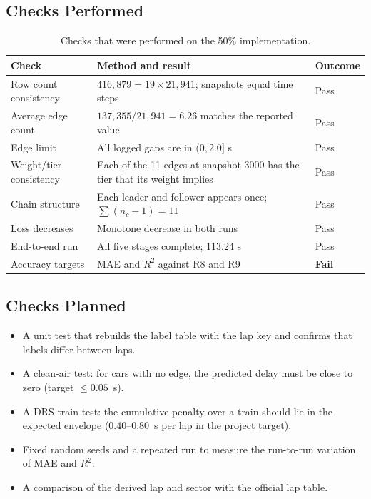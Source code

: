 \documentclass[11pt,a4paper]{article}
\begin{document}
\subsection{Checks Performed}
\begin{table}[H]
\centering
\caption{Checks that were performed on the 50\% implementation.}
\label{tab:checks}
\small
\begin{tabularx}{\linewidth}{@{}p{4.1cm}Xl@{}}
\toprule
\textbf{Check} & \textbf{Method and result} & \textbf{Outcome} \\
\midrule
Row count consistency & $416{,}879 = 19 \times 21{,}941$; snapshots equal time steps & Pass \\
Average edge count & $137{,}355 / 21{,}941 = 6.26$ matches the reported value & Pass \\
Edge limit & All logged gaps are in $(0, 2.0]$ s & Pass \\
Weight/tier consistency & Each of the 11 edges at snapshot 3000 has the tier that its weight implies & Pass \\
Chain structure & Each leader and follower appears once; $\sum(n_c-1)=11$ & Pass \\
Loss decreases & Monotone decrease in both runs & Pass \\
End-to-end run & All five stages complete; 113.24 s & Pass \\
Accuracy targets & MAE and $R^2$ against R8 and R9 & \textbf{Fail} \\
\bottomrule
\end{tabularx}
\end{table}

\subsection{Checks Planned}
\begin{itemize}[leftmargin=*]
  \item A unit test that rebuilds the label table with the lap key and
        confirms that labels differ between laps.
  \item A clean-air test: for cars with no edge, the predicted delay must be
        close to zero (target $\le 0.05$~s).
  \item A DRS-train test: the cumulative penalty over a train should lie in
        the expected envelope (0.40--0.80~s per lap in the project target).
  \item Fixed random seeds and a repeated run to measure the run-to-run
        variation of MAE and $R^2$.
  \item A comparison of the derived lap and sector with the official lap table.
\end{itemize}
\end{document}
